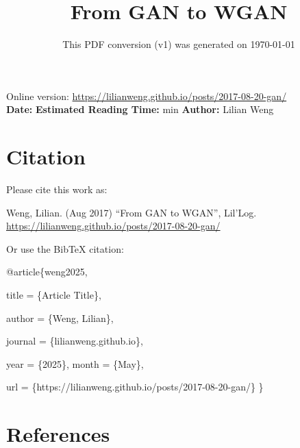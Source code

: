 \documentclass[12pt]{article}
\title{From GAN to WGAN}
\date{This PDF conversion (v1) was generated on \today\footnotemark}
\begin{document}
\maketitle
\begin{center}
    Online version: \url{https://lilianweng.github.io/posts/2017-08-20-gan/} \\
    \textbf{Date:} \quad
    \textbf{Estimated Reading Time:}  min \quad
    \textbf{Author:} Lilian Weng
\end{center}




\newpage
\tableofcontents
\newpage
\vspace{1em}
\n\n\n\section{Citation}
Please cite this work as:

\begin{tcolorbox}[colback=black!5!white, colframe=black!80!white, boxrule=0.5pt, arc=2mm, left=1mm, right=1mm, top=1mm, bottom=1mm]
  Weng, Lilian. (Aug 2017) ``From GAN to WGAN'', Lil'Log. \url{https://lilianweng.github.io/posts/2017-08-20-gan/}
  \end{tcolorbox}

Or use the BibTeX citation:

\begin{tcolorbox}[
    colback=black!5!white,
    colframe=black!80!white,
    boxrule=0.5pt,
    arc=2mm,
    left=1mm,
    right=1mm,
    top=1mm,
    bottom=1mm,
    listing only,
    listing options={
      basicstyle=\ttfamily\footnotesize,
      breaklines=true,
      literate={\{}{{\char`\{}}1 {\}}{{\char`\}}}1
    }
  ]
  @article\{weng2025,

    title   = \{Article Title\},

    author  = \{Weng, Lilian\},

    journal = \{lilianweng.github.io\},

    year    = \{2025\},
    month   = \{May\},

    url     = \{https://lilianweng.github.io/posts/2017-08-20-gan/\}\n
  \}
  \end{tcolorbox}

\newpage
\section{References}

\n
\end{document}
